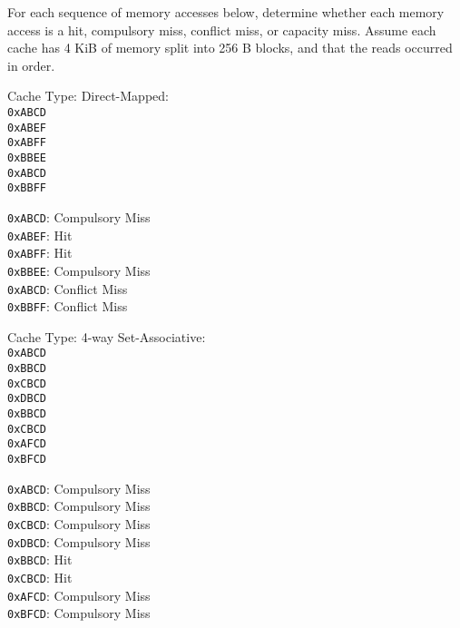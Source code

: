\question
For each sequence of memory accesses below, determine whether each memory access is a hit, compulsory miss, conflict miss, or capacity miss. Assume each cache has 4 KiB of memory split into 256 B blocks, and that the reads occurred in order.

\begin{blocksection}
Cache Type: Direct-Mapped:
\\
\lstinline$0xABCD$\\
\lstinline$0xABEF$\\
\lstinline$0xABFF$\\
\lstinline$0xBBEE$\\
\lstinline$0xABCD$\\
\lstinline$0xBBFF$\\

\begin{solution}[0.7in]
\lstinline$0xABCD$: Compulsory Miss\\
\lstinline$0xABEF$: Hit\\
\lstinline$0xABFF$: Hit\\
\lstinline$0xBBEE$: Compulsory Miss\\
\lstinline$0xABCD$: Conflict Miss\\
\lstinline$0xBBFF$: Conflict Miss\\
\end{solution}
\end{blocksection}

\begin{blocksection}
Cache Type: 4-way Set-Associative:
\\
\lstinline$0xABCD$\\
\lstinline$0xBBCD$\\
\lstinline$0xCBCD$\\
\lstinline$0xDBCD$\\
\lstinline$0xBBCD$\\
\lstinline$0xCBCD$\\
\lstinline$0xAFCD$\\
\lstinline$0xBFCD$\\

\begin{solution}[0.7in]
\lstinline$0xABCD$: Compulsory Miss\\
\lstinline$0xBBCD$: Compulsory Miss\\
\lstinline$0xCBCD$: Compulsory Miss\\
\lstinline$0xDBCD$: Compulsory Miss\\
\lstinline$0xBBCD$: Hit\\
\lstinline$0xCBCD$: Hit\\
\lstinline$0xAFCD$: Compulsory Miss\\
\lstinline$0xBFCD$: Compulsory Miss\\
\end{solution}
\end{blocksection}

